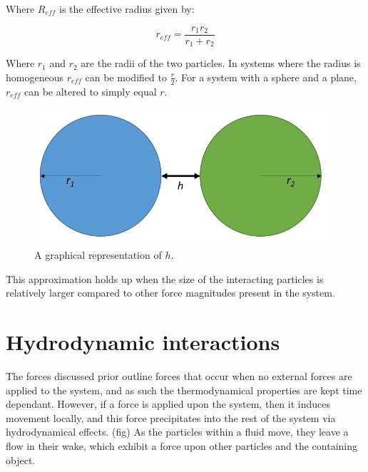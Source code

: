 Where $R_{eff}$ is the effective radius given by:

\begin{equation} %
r_{eff} = \frac{r_1r_2}{r_1 + r_2}
\end{equation}

Where $r_1$ and $r_2$ are the radii of the two particles. In systems where the radius is homogeneous $r_{eff}$ can be modified to $\frac{r}{2}$. For a system with a sphere and a plane, $r_{eff}$ can be altered to simply equal $r$.

\begin{figure}[h]     %
        \begin{center}
          \includegraphics[width=110mm]{chapter1/h_graph.PNG}
\end{center}
\caption{A graphical representation of $h$.}
\label{fig:h_graph}                 %
\end{figure}

This approximation holds up when the size of the interacting particles is relatively larger compared to other force magnitudes present in the system. 

\cite{DLVOsmolOverview, smolBook1}


\cite{DLVOsmolOverview, smolBook1, Origin2V, IsGreenBook}

\cite{surfpattQ} \cite{Surfquestion} 

%





\section{Hydrodynamic interactions}
The forces discussed prior outline forces that occur when no external forces are applied to the system, and as such the thermodynamical properties are kept time dependant. However, if a force is applied upon the system, then it induces movement locally, and this force precipitates into the rest of the system via hydrodynamical effects. (fig) As the particles within a fluid move, they leave a flow in their wake, which exhibit a force upon other particles and the containing object.

